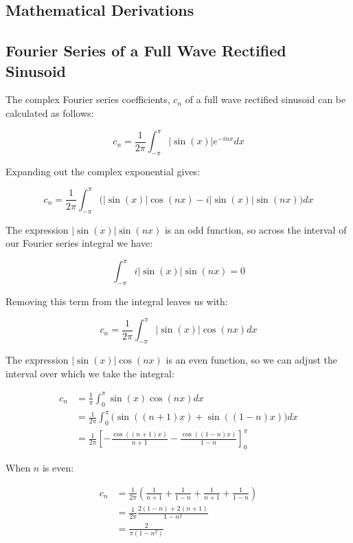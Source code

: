 \begin{appendices}
\chapter{Mathematical Derivations}
\label{app:MathematicalDerivations}
	\section{Fourier Series of a Full Wave Rectified Sinusoid}
	\label{app:MathematicalDerivations-Rectification}
		The complex Fourier series coefficients, $c_{n}$ of a full wave rectified sinusoid can be calculated as
		follows:

		\[ c_{n} = \frac{1}{2\pi} \int_{-\pi}^{\pi} |\sin(x)|e^{-inx} dx \]

		Expanding out the complex exponential gives:

		\[ c_{n} = \frac{1}{2\pi} \int_{-\pi}^{\pi} \bigl( |\sin(x)|\cos(nx) - i|\sin(x)|\sin(nx) \bigr) dx \]

		The expression $|\sin(x)|\sin(nx)$ is an odd function, so across the interval of our Fourier series integral
		we have:

		\[ \int_{-\pi}^{\pi} i|\sin(x)|\sin(nx) = 0 \]

		Removing this term from the integral leaves us with:

		\[ c_{n} = \frac{1}{2\pi} \int_{-\pi}^{\pi} |\sin(x)|\cos(nx) dx \]

		The expression $|\sin(x)|\cos(nx)$ is an even function, so we can adjust the interval over which we take the
		integral:

		\begin{align}
			c_{n} & = \frac{1}{\pi} \int_{0}^{\pi} \sin(x)\cos(nx) dx \nonumber \\[0.6em]
			& = \frac{1}{2\pi} \int_{0}^{\pi} \bigl( \sin((n+1)x) + \sin((1-n)x) \bigr) dx \nonumber \\[0.6em]
			& = \frac{1}{2\pi} \left[ -\frac{\cos((n+1)x)}{n+1} - 
				\frac{\cos((1-n)x)}{1-n} \right]_{0}^{\pi} \nonumber
		\end{align}

		When $n$ is even:

		\begin{align}
			c_{n} & = \frac{1}{2\pi} \left( \frac{1}{n+1} + \frac{1}{1-n} 
				+ \frac{1}{n+1} + \frac{1}{1-n} \right) \nonumber \\[0.6em]
			& = \frac{1}{2\pi} \frac{2(1-n) + 2(n+1)}{1 - n^{2}} \nonumber \\[0.6em]
			& = \frac{2}{\pi(1 - n^{2})} \nonumber
		\end{align}


\end{appendices}
